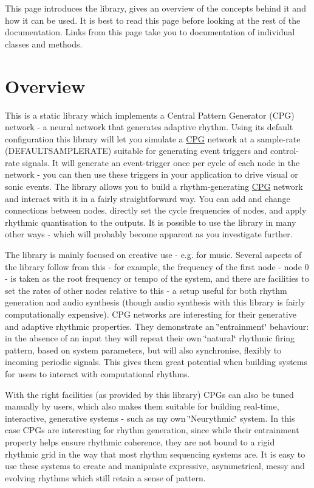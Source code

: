 This page introduces the library, gives an overview of the concepts behind it and how it can be used. It is best to read this page before looking at the rest of the documentation. Links from this page take you to documentation of individual classes and methods.

\section*{Overview}

This is a static library which implements a Central Pattern Generator (C\+PG) network -\/ a neural network that generates adaptive rhythm. Using its default configuration this library will let you simulate a \mbox{\hyperlink{classCPG}{C\+PG}} network at a sample-\/rate (D\+E\+F\+A\+U\+L\+T\+S\+A\+M\+P\+L\+E\+R\+A\+TE) suitable for generating event triggers and control-\/rate signals. It will generate an event-\/trigger once per cycle of each node in the network -\/ you can then use these triggers in your application to drive visual or sonic events. The library allows you to build a rhythm-\/generating \mbox{\hyperlink{classCPG}{C\+PG}} network and interact with it in a fairly straightforward way. You can add and change connections between nodes, directly set the cycle frequencies of nodes, and apply rhythmic quantisation to the outputs. It is possible to use the library in many other ways -\/ which will probably become apparent as you investigate further.

The library is mainly focused on creative use -\/ e.\+g. for music. Several aspects of the library follow from this -\/ for example, the frequency of the first node -\/ node 0 -\/ is taken as the root frequency or tempo of the system, and there are facilities to set the rates of other nodes relative to this -\/ a setup useful for both rhythm generation and audio synthesis (though audio synthesis with this library is fairly computationally expensive). C\+PG networks are interesting for their generative and adaptive rhythmic properties. They demonstrate an \char`\"{}entrainment\char`\"{} behaviour\+: in the absence of an input they will repeat their own \char`\"{}natural\char`\"{} rhythmic firing pattern, based on system parameters, but will also synchronise, flexibly to incoming periodic signals. This gives them great potential when building systems for users to interact with computational rhythms.

With the right facilities (as provided by this library) C\+P\+Gs can also be tuned manually by users, which also makes them suitable for building real-\/time, interactive, generative systems -\/ such as my own \char`\"{}\+Neurythmic\char`\"{} system. In this case C\+P\+Gs are interesting for rhythm generation, since while their entrainment property helps ensure rhythmic coherence, they are not bound to a rigid rhythmic grid in the way that most rhythm sequencing systems are. It is easy to use these systems to create and manipulate expressive, asymmetrical, messy and evolving rhythms which still retain a sense of pattern.

